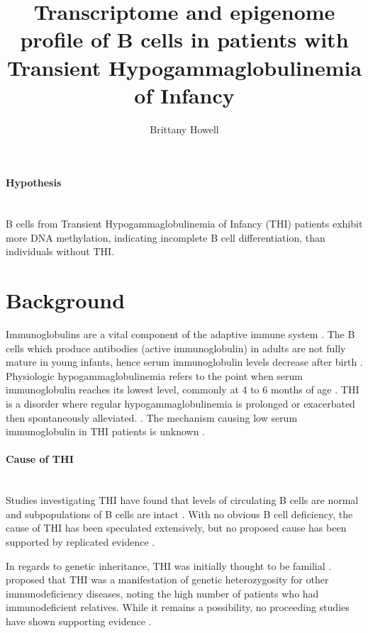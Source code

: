 \documentclass[12pt]{article}
\title{Transcriptome and epigenome profile of B cells in patients with Transient Hypogammaglobulinemia of Infancy}
\date{}
\author{Brittany Howell}
\begin{document}
	\maketitle
	
	\paragraph{Hypothesis}
	~\\
	B cells from Transient Hypogammaglobulinemia of Infancy (THI) patients exhibit more DNA methylation, indicating incomplete B cell differentiation, than individuals without THI.
	
	\section{Background}
	
		Immunoglobulins are a vital component of the adaptive immune system \citep{Simon15}.  
		The B cells which produce antibodies (active immunoglobulin) in adults are not fully mature in young infants, hence serum immunoglobulin levels decrease after birth \citep{Martin10,Rechavi15,Stiemh80}. 
		Physiologic hypogammaglobulinemia refers to the point when serum immunoglobulin reaches its lowest level, commonly at 4 to 6 months of age \citep{Dressler89}. 
		THI is a disorder where regular hypogammaglobulinemia is prolonged or exacerbated then spontaneously alleviated. \citep{Stiemh80,Dressler89,AlHerz14,Gitlin56,AlHerz11,Rosen66,McGeady87, Dalal98,Tiller78,Buckley83}.
		The mechanism causing low serum immunoglobulin in THI patients is unknown \citep{AlHerz14}. 

			
		\paragraph{Cause of THI} 
			~\\
			Studies investigating THI have found that levels of circulating B cells are normal and subpopulations of B cells are intact \citep{Tiller78,Stiemh80,Siegel81,Buckley83,Fiorilli86,Dressler89}.
			With no obvious B cell deficiency, the cause of THI has been speculated extensively, but no proposed cause has been supported by replicated evidence \citep{Fudenberg64,Rosen66,Nathenson71,Willenbockel60,Soothill68,Tiller78,Fiorilli86,Ovadia14,Siegel81,McGeady87}.
			
			In regards to genetic inheritance, THI was initially thought to be familial \citep{Willenbockel60}. 
			\citet{Soothill68} proposed that THI was a manifestation of genetic heterozygosity for other immunodeficiency diseases, noting the high number of patients who had immunodeficient relatives.
			While it remains a possibility, no proceeding studies have shown supporting evidence \citep{Tiller78,Fiorilli86, Ovadia14}.
			
\end{document}
